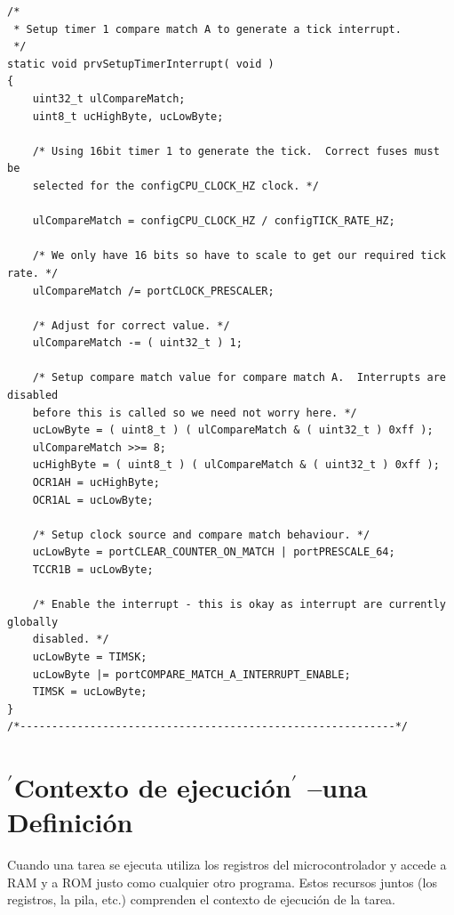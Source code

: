 \documentclass[12pt]{article}
\begin{document}
\begin{verbatim}
/*
 * Setup timer 1 compare match A to generate a tick interrupt.
 */
static void prvSetupTimerInterrupt( void )
{
    uint32_t ulCompareMatch;
    uint8_t ucHighByte, ucLowByte;
    
    /* Using 16bit timer 1 to generate the tick.  Correct fuses must be
    selected for the configCPU_CLOCK_HZ clock. */
    
    ulCompareMatch = configCPU_CLOCK_HZ / configTICK_RATE_HZ;
    
    /* We only have 16 bits so have to scale to get our required tick rate. */
    ulCompareMatch /= portCLOCK_PRESCALER;
    
    /* Adjust for correct value. */
    ulCompareMatch -= ( uint32_t ) 1;
    
    /* Setup compare match value for compare match A.  Interrupts are disabled 
    before this is called so we need not worry here. */
    ucLowByte = ( uint8_t ) ( ulCompareMatch & ( uint32_t ) 0xff );
    ulCompareMatch >>= 8;
    ucHighByte = ( uint8_t ) ( ulCompareMatch & ( uint32_t ) 0xff );
    OCR1AH = ucHighByte;
    OCR1AL = ucLowByte;
    
    /* Setup clock source and compare match behaviour. */
    ucLowByte = portCLEAR_COUNTER_ON_MATCH | portPRESCALE_64;
    TCCR1B = ucLowByte;
    
    /* Enable the interrupt - this is okay as interrupt are currently globally
    disabled. */
    ucLowByte = TIMSK;
    ucLowByte |= portCOMPARE_MATCH_A_INTERRUPT_ENABLE;
    TIMSK = ucLowByte;
}
/*-----------------------------------------------------------*/
\end{verbatim}
\section{{\LARGE $^{\prime}$}Contexto de ejecución{\LARGE $^{\prime}$} 
--una Def\/inición}
Cuando una tarea se ejecuta utiliza los registros del microcontrolador y accede a 
RAM y a ROM justo como cualquier otro programa. Estos recursos juntos (los 
registros, la pila, etc.) comprenden el contexto de ejecución de la tarea.
\end{document}
